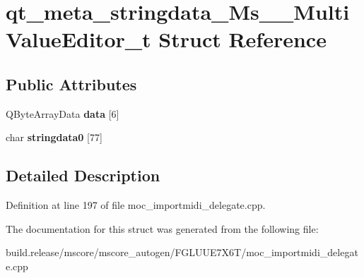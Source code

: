 \hypertarget{structqt__meta__stringdata___ms_____multi_value_editor__t}{}\section{qt\+\_\+meta\+\_\+stringdata\+\_\+\+Ms\+\_\+\+\_\+\+Multi\+Value\+Editor\+\_\+t Struct Reference}
\label{structqt__meta__stringdata___ms_____multi_value_editor__t}
\subsection*{Public Attributes}
\begin{DoxyCompactItemize}
\item 
\mbox{\label{structqt__meta__stringdata___ms_____multi_value_editor__t_a7d67d269fa4533f5fd95b3a8262404d1}} 
Q\+Byte\+Array\+Data {\bfseries data} \mbox{[}6\mbox{]}
\item 
\mbox{\label{structqt__meta__stringdata___ms_____multi_value_editor__t_a7286751c34d511d3ecea949d0d81f0e2}} 
char {\bfseries stringdata0} \mbox{[}77\mbox{]}
\end{DoxyCompactItemize}


\subsection{Detailed Description}


Definition at line 197 of file moc\+\_\+importmidi\+\_\+delegate.\+cpp.



The documentation for this struct was generated from the following file\+:\begin{DoxyCompactItemize}
\item 
build.\+release/mscore/mscore\+\_\+autogen/\+F\+G\+L\+U\+U\+E7\+X6\+T/moc\+\_\+importmidi\+\_\+delegate.\+cpp\end{DoxyCompactItemize}
